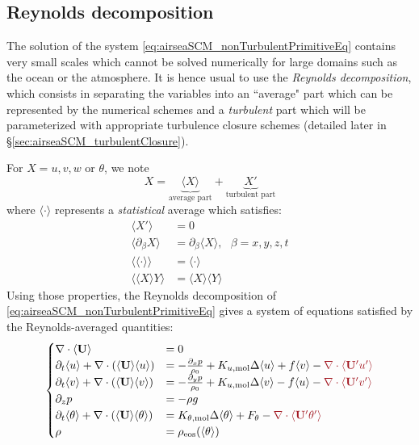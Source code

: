 \subsection{Reynolds decomposition}
The solution of the system \eqref{eq:airseaSCM_nonTurbulentPrimitiveEq}
contains very small scales which cannot be solved numerically for
large domains such as the ocean or the atmosphere. It is hence usual
to use the \textit{Reynolds decomposition}, which consists in
separating the variables into an ``average" part which can be
represented by the numerical schemes and a \textit{turbulent}
part which will be parameterized with appropriate turbulence closure
schemes
(detailed later in \S \ref{sec:airseaSCM_turbulentClosure}).
\par
For $X=u, v, w$ or $\theta$, we note
\begin{equation}
	X =
	\underbrace{\langle X\rangle}_{\text{average part}}
	+
	\underbrace{
	\left.X'\right.
}_{\text{turbulent part}}
\end{equation}
where $\langle \cdot \rangle$ represents a \textit{statistical}
average which satisfies:
\begin{equation}
\begin{aligned}
	\langle X' \rangle &= 0 \\
	\langle \partial_\beta X \rangle &=
	\partial_\beta \langle  X \rangle, ~~~\beta=x,y,z,t \\
	\langle\langle \cdot \rangle\rangle &= \langle \cdot \rangle \\
	\langle \langle X \rangle Y\rangle &= \langle X \rangle\langle Y \rangle
\end{aligned}
\end{equation}
Using those properties, the Reynolds decomposition of 
\eqref{eq:airseaSCM_nonTurbulentPrimitiveEq} gives a system
of equations satisfied by the Reynolds-averaged quantities:
\begin{equation}
	\label{eq:airseaSCM_TurbulentPrimitiveEq}
\begin{cases}
	\nabla \cdot \langle\mathbf{U}\rangle &= 0 \\
	\partial_t \langle u \rangle+ \nabla \cdot
	(\langle\mathbf{U}\rangle \langle u\rangle) &=
	- \frac{\partial_x  p}{\rho_0} +
	K_{u, {\rm mol}} \Delta \langle u\rangle
	+ f \langle v\rangle - \emphase{\nabla \cdot \langle
	\mathbf{U}' u'\rangle}\\
	\partial_t \langle v\rangle + \nabla \cdot
	(\langle \mathbf{U}\rangle \langle v\rangle) &=
	- \frac{\partial_y  p}{\rho_0} +
	K_{u, {\rm mol}} \Delta \langle v\rangle
	- f \langle u\rangle  - \emphase{\nabla \cdot \langle
	\mathbf{U}' v'\rangle}\\
	\partial_z p &= -\rho g \\
	\partial_t \langle\theta\rangle + \nabla \cdot
	(\langle\mathbf{U}\rangle \langle\theta\rangle) &=
	K_{\theta, {\rm mol}} \Delta \langle\theta\rangle
	+ F_\theta - \emphase{\nabla \cdot \langle
	\mathbf{U}' \theta'\rangle}\\
	\rho &= \rho_{\rm eos}(\langle\theta\rangle)
\end{cases}
\end{equation}
